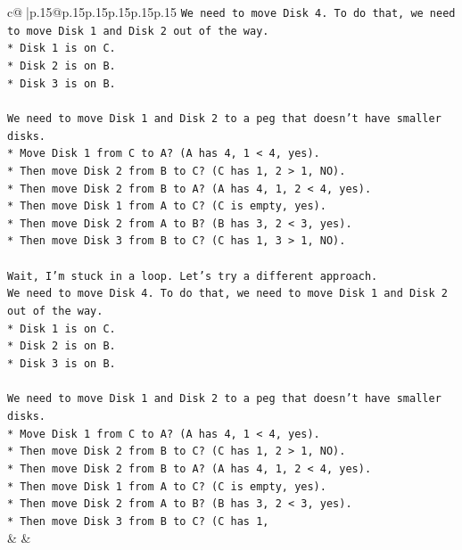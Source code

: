 \documentclass{article}
\begin{document}
{\begin{supertabular}{c@{$\;$}|p{.15\linewidth}@{}p{.15\linewidth}p{.15\linewidth}p{.15\linewidth}p{.15\linewidth}p{.15\linewidth}}
{{{\texttt{We need to move Disk 4. To do that, we need to move Disk 1 and Disk 2 out of the way.} \\
\texttt{*   Disk 1 is on C.} \\
\texttt{*   Disk 2 is on B.} \\
\texttt{*   Disk 3 is on B.} \\
\\ 
\texttt{We need to move Disk 1 and Disk 2 to a peg that doesn't have smaller disks.} \\
\texttt{*   Move Disk 1 from C to A? (A has 4, 1 < 4, yes).} \\
\texttt{*   Then move Disk 2 from B to C? (C has 1, 2 > 1, NO).} \\
\texttt{*   Then move Disk 2 from B to A? (A has 4, 1, 2 < 4, yes).} \\
\texttt{*   Then move Disk 1 from A to C? (C is empty, yes).} \\
\texttt{*   Then move Disk 2 from A to B? (B has 3, 2 < 3, yes).} \\
\texttt{*   Then move Disk 3 from B to C? (C has 1, 3 > 1, NO).} \\
\\ 
\texttt{Wait, I'm stuck in a loop. Let's try a different approach.} \\
\texttt{We need to move Disk 4. To do that, we need to move Disk 1 and Disk 2 out of the way.} \\
\texttt{*   Disk 1 is on C.} \\
\texttt{*   Disk 2 is on B.} \\
\texttt{*   Disk 3 is on B.} \\
\\ 
\texttt{We need to move Disk 1 and Disk 2 to a peg that doesn't have smaller disks.} \\
\texttt{*   Move Disk 1 from C to A? (A has 4, 1 < 4, yes).} \\
\texttt{*   Then move Disk 2 from B to C? (C has 1, 2 > 1, NO).} \\
\texttt{*   Then move Disk 2 from B to A? (A has 4, 1, 2 < 4, yes).} \\
\texttt{*   Then move Disk 1 from A to C? (C is empty, yes).} \\
\texttt{*   Then move Disk 2 from A to B? (B has 3, 2 < 3, yes).} \\
\texttt{*   Then move Disk 3 from B to C? (C has 1,} \\
            }
        }
    }
    & & \\ \\


\end{supertabular}}
\end{document}
